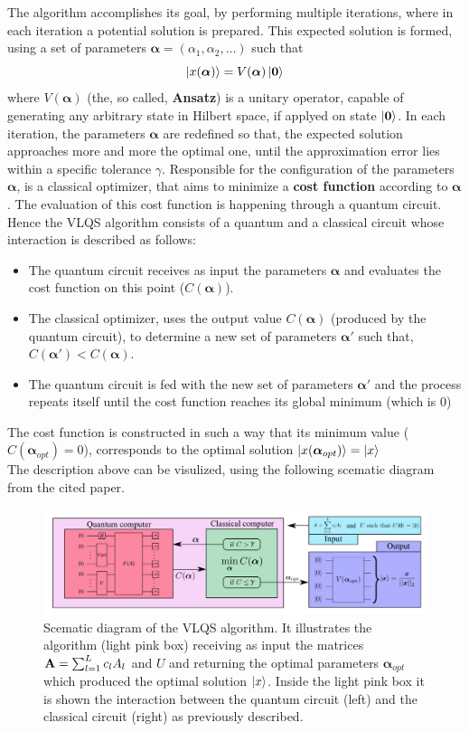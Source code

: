 \documentclass[12pt]{article}
\begin{document}
The algorithm accomplishes its goal, by performing multiple iterations, where in each iteration a potential solution is prepared. This expected solution is formed, using
a set of parameters ${\boldsymbol{\alpha}} = (\alpha_1,\alpha_2,...)$ such that 
$$\left\vert{x(\boldsymbol{\alpha})}\right\rangle = V(\boldsymbol{\alpha})\left\vert{\bf 0}\right\rangle $$
where $V(\boldsymbol{\alpha})$ (the, so called, {\bf Ansatz}) is a unitary operator, capable of generating any arbitrary state in Hilbert space, if applyed on state $\left\vert{\bf 0}\right\rangle$.
In each iteration, the parameters $\boldsymbol{\alpha}$ are redefined so that, the expected solution approaches more and more the optimal one, until the approximation error lies within a specific tolerance $\gamma$.
Responsible for the configuration of the parameters $\boldsymbol{\alpha}$, is a classical optimizer, that aims to minimize a {\bf cost function} according to $\boldsymbol{\alpha}$. The evaluation of this cost function
 is happening through a quantum circuit. Hence the VLQS algorithm consists of a quantum and a classical circuit whose interaction is described as follows:
\begin{itemize}
    \item The quantum circuit receives as input the parameters $\boldsymbol{\alpha}$ and evaluates the cost function on this point ($C(\boldsymbol{\alpha})$).
    \item The classical optimizer, uses the output value $C(\boldsymbol{\alpha})$ (produced by the quantum circuit), to determine a new set of parameters $\boldsymbol{\alpha}'$ 
    such that, $C(\boldsymbol{\alpha}') < C(\boldsymbol{\alpha})$.
    \item The quantum circuit is fed with the new set of parameters $\boldsymbol{\alpha}'$ and the process repeats itself until the cost function reaches its global minimum (which is $0$) 
\end{itemize}
The cost function is constructed in such a way that its minimum value ($C(\boldsymbol{\alpha}_{opt}) = 0$), corresponds to the optimal solution $\left\vert{x(\boldsymbol{\alpha}_{opt})}\right\rangle = \left\vert{x}\right\rangle$\\
The description above can be visulized, using the following scematic diagram from the cited paper. 
\begin{figure}[H]
    
    \centering
    \includegraphics[scale=0.57]{bro.png}
   
    \caption{
        \justifying
        Scematic diagram of the VLQS algorithm. It illustrates the algorithm (light pink box) receiving as input the matrices ${\bf A} = \sum_{l = 1}^{L}c_lA_l$ and $U$ and returning the optimal parameters 
    $\boldsymbol{\alpha}_{opt}$ which produced the optimal solution $\left\vert{x}\right\rangle$. Inside the light pink box it is shown the interaction between the quantum circuit (left) and the classical circuit (right) as previously described.}
\end{figure}
\end{document}
